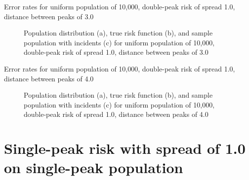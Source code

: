\graphicspath{{./results/unif_100_1_2h_3/}}
\makeatletter
{}
\makeatother

\begin{table}[H]
    
    \caption[]{Error rates for uniform population of 10,000, double-peak risk of \gls{spread} 1.0, distance between peaks of 3.0}
    \label{tab:mean_error_rates:unif_100_1_2h_3}
\end{table}

\begin{figure}[H]
    
    \caption[]{Population distribution (a), true risk function (b), and sample population with incidents (c) for uniform population of 10,000, double-peak risk of \gls{spread} 1.0, distance between peaks of 3.0}
    \label{fig:distributions:unif_100_1_2h_3}    
\end{figure}

\graphicspath{{./results/unif_100_1_2h_4/}}
\makeatletter
{}
\makeatother

\begin{table}[H]
    
    \caption[]{Error rates for uniform population of 10,000, double-peak risk of \gls{spread} 1.0, distance between peaks of 4.0}
    \label{tab:mean_error_rates:unif_100_1_2h_4}
\end{table}

\begin{figure}[H]
    
    \caption[]{Population distribution (a), true risk function (b), and sample population with incidents (c) for uniform population of 10,000, double-peak risk of \gls{spread} 1.0, distance between peaks of 4.0}
    \label{fig:distributions:unif_100_1_2h_4}    
\end{figure}

\section{Single-peak risk with spread of 1.0 on single-peak population}
\label{sec:app:results_p1.4_100_1_1h_X}

